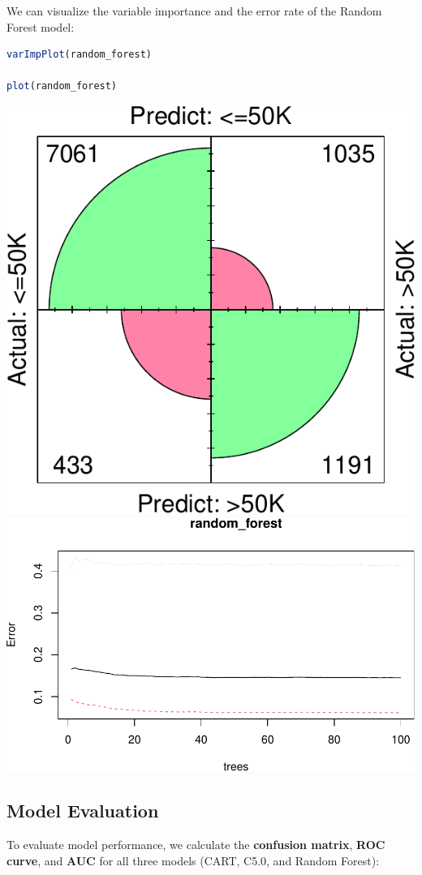 \documentclass[
]{book}
\theoremstyle{definition}
\theoremstyle{definition}
\theoremstyle{definition}
\theoremstyle{definition}
\theoremstyle{remark}
\begin{document}
We can visualize the variable importance and the error rate of the Random Forest model:

\begin{lstlisting}[language=R]
varImpPlot(random_forest)

plot(random_forest)
\end{lstlisting}

\begin{center}\includegraphics[width=0.7\linewidth]{tree_files/figure-latex/unnamed-chunk-10-1} \includegraphics[width=0.7\linewidth]{tree_files/figure-latex/unnamed-chunk-10-2} \end{center}

\subsection*{Model Evaluation}\label{model-evaluation}

To evaluate model performance, we calculate the \textbf{confusion matrix}, \textbf{ROC curve}, and \textbf{AUC} for all three models (CART, C5.0, and Random Forest):
\end{document}
